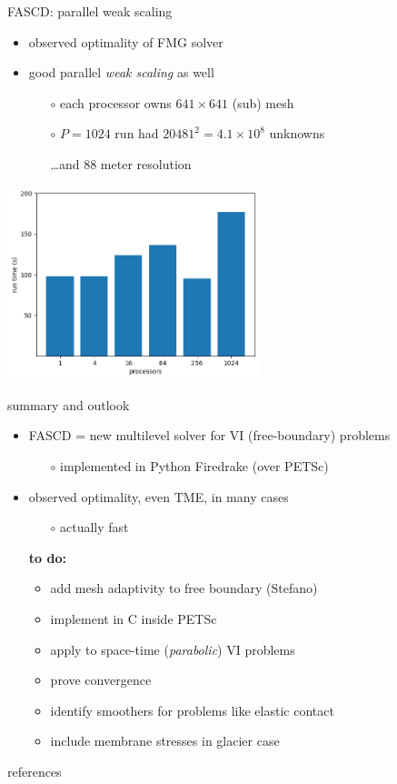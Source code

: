 \documentclass[svgnames,
               hyperref={colorlinks,citecolor=DeepPink4,linkcolor=FireBrick,urlcolor=Maroon},
               usepdftitle=false]  %
               {beamer}
\begin{document}
\begin{frame}{FASCD: parallel weak scaling}

\begin{itemize}
\item observed optimality of FMG solver
\item good parallel \emph{weak scaling} as well
    \begin{itemize}
    \item[$\circ$] each processor owns $641\times 641$ (sub) mesh
    \item[$\circ$] $P=1024$ run had $20481^2=4.1\times 10^8$ unknowns
    \item[] \dots and 88 meter resolution
    \end{itemize}
\end{itemize}

\bigskip
\centering
\includegraphics[width=0.55\textwidth]{../talk-dms/figs/siaweaktime.png}
\end{frame}


\begin{frame}{summary and outlook}

\begin{itemize}
\item FASCD = new multilevel solver for VI (free-boundary) problems
    \begin{itemize}
    \item[$\circ$] implemented in Python Firedrake (over PETSc)
    \end{itemize}
\item observed optimality, even TME, in many cases
    \begin{itemize}
    \item[$\circ$] actually fast
    \end{itemize}

\bigskip\bigskip
\item[] \textbf{{\color{FireBrick} to do:}}
    \begin{itemize}
    \item add mesh adaptivity to free boundary (Stefano)
    \item implement in C inside PETSc
    \item apply to space-time (\emph{parabolic}) VI problems
    \item prove convergence
    \item identify smoothers for problems like elastic contact
    \item include membrane stresses in glacier case
    \end{itemize}
\end{itemize}
\end{frame}


\begin{frame}{references}

{\footnotesize

}
\end{frame}
\end{document}
